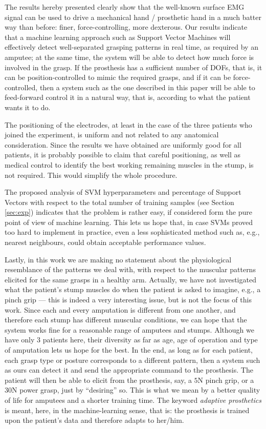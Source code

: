 The results hereby presented clearly show that the well-known surface
EMG signal can be used to drive a mechanical hand / prosthetic hand in
a much batter way than before: finer, force-controlling, more dexterous. Our
results indicate that a machine learning approach such as Support
Vector Machines will effectively detect well-separated grasping
patterns in real time, as required by an amputee; at the same time,
the system will be able to detect how much force is involved in the
grasp. If the prosthesis has a sufficient number of DOFs, that is, it
can be position-controlled to mimic the required grasps, and if it can
be force-controlled, then a system such as the one described in this paper
will be able to feed-forward control it in a natural way, that is,
according to what the patient wants it to do.

The positioning of the electrodes, at least in the case of the three
patients who joined the experiment, is uniform and not related to any
anatomical consideration. Since the results we have obtained are
uniformly good for all patients, it is probably possible to claim that
careful positioning, as well as medical control to identify the best
working remaining muscles in the stump, is not required. This would
simplify the whole procedure.

The proposed analysis of SVM hyperparameters and percentage of Support
Vectors with respect to the total number of training samples (see
Section \ref{sec:exp}) indicates that the problem is rather easy, if
considered form the pure point of view of machine learning. This lets
us hope that, in case SVMs proved too hard to implement in practice,
even a less sophisticated method such as, e.g., nearest neighbours,
could obtain acceptable performance values.

Lastly, in this work we are making no statement about the physiological
resemblance of the patterns we deal with, with respect to the muscular
patterns elicited for the same grasps in a healthy arm. Actually, we
have not investigated what the patient's stump muscles do when the
patient is asked to imagine, e.g., a pinch grip --- this is indeed a
very interesting issue, but is not the focus of this work. Since each
and every amputation is different from one another, and therefore each
stump has different muscular conditions, we can hope that
the system works fine for a reasonable range of amputees and
stumps. Although we have only $3$ patients here, their diversity as
far as age, age of operation and type of amputation lets us hope for
the best. In the end, as long as for each patient, each grasp type or
posture corresponds to a different pattern, then a system such as ours
can detect it and send the appropriate command to the prosthesis.
The patient will then
be able to elicit from the prosthesis, say, a $5$N pinch grip, or a
$30$N power grasp, just by ``desiring'' so. This is what we mean by a
better quality of life for amputees and a shorter training time. The
keyword \emph{adaptive prosthetics} is meant, here, in the
machine-learning sense, that is: the prosthesis is trained upon the
patient's data and therefore adapts to her/him.

